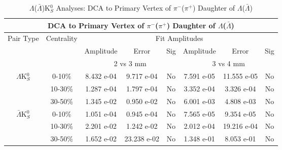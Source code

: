 \documentclass[../AnalysisNoteJBuxton.tex]{subfiles}
\begin{document}
\begin{table}
 \centering
 \begin{tabular}{|c|c|c|c|c||c|c|c|}
  \multicolumn{8}{c}{DCA to Primary Vertex of $\pi^{-}$($\pi^{+}$) Daughter of $\Lambda$($\bar{\Lambda}$)} \\
  \hline
  \multirow{3}{*}{Pair Type} & \multirow{3}{*}{Centrality} & \multicolumn{6}{c|}{Fit Amplitudes} \\
  \cline{3-8}
   & & Amplitude & Error & Sig & Amplitude & Error & Sig \\  
  \cline{3-8}
   & & \multicolumn{3}{c||}{2 vs 3 mm} & \multicolumn{3}{c|}{3 vs 4 mm} \\  
  \hline  
  \multirow{3}{*}{$\Lambda$K$^{0}_{S}$}  
   &  0-10\% & 8.432 e-04 & 9.717 e-04 & No & 7.591 e-05 & 11.555 e-05 & No \\
   & 10-30\% & 1.287 e-04 & 1.797 e-04 & No & 3.352 e-04 & 3.326 e-04 & No \\
   & 30-50\% & 1.345 e-02 & 0.950 e-02 & No & 6.001 e-03 & 4.808 e-03 & No \\
  \hline  
  \multirow{3}{*}{$\bar{\Lambda}$K$^{0}_{S}$}  
   &  0-10\% & 1.051 e-04 & 0.945 e-04 & No & 7.565 e-05 & 9.354 e-05 & No \\
   & 10-30\% & 2.201 e-02 & 1.242 e-02 & No & 2.012 e-04 & 19.216 e-04 & No \\
   & 30-50\% & 1.652 e-02 & 23.238 e-02 & No & 1.348 e-01 & 8.053 e-01 & No \\
  \hline
 \end{tabular}
 \caption{$\Lambda$($\bar{\Lambda}$)K$^{0}_{S}$ Analyses: DCA to Primary Vertex of $\pi^{-}$($\pi^{+}$) Daughter of $\Lambda$($\bar{\Lambda}$)}
 \label{tab:DcaToPrimVertexPionDaughtOfLamLamK0}
\end{table}
\end{document}
